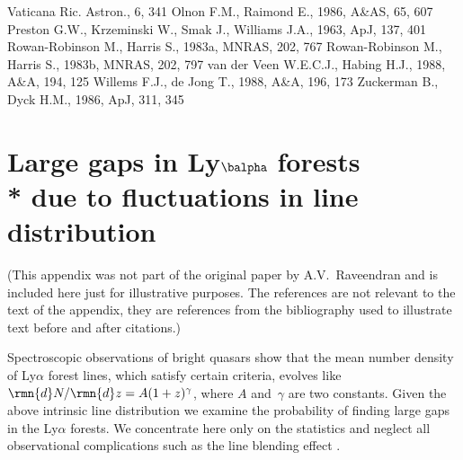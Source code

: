 \documentclass[useAMS,usedcolumn,usegraphicx,usenatbib]{mn2e}
\begin{document}
\begin{thebibliography}{99}
Vaticana Ric. Astron., 6, 341
 Olnon F.M., Raimond E., 1986,
A\&AS, 65, 607
 Preston G.W., Krzeminski W., Smak J.,
Williams J.A., 1963, ApJ, 137, 401
 Rowan-Robinson M., Harris
S., 1983a, MNRAS, 202, 767
 Rowan-Robinson M., Harris
S., 1983b, MNRAS, 202, 797
 van der Veen W.E.C.J., Habing
H.J., 1988, A\&A, 194, 125
 Willems F.J., de Jong T., 1988,
A\&A, 196, 173
 Zuckerman B., Dyck H.M., 1986, ApJ,
311, 345

\end{thebibliography}

\appendix

\section[]{Large gaps in L\lowercase{y}${\balpha}$ forests\\* due to fluctuations in line distribution}

(This appendix was not part of the original paper by
A.V.~Raveendran and is included here just for illustrative
purposes. The references are not relevant to the text of the
appendix, they are references from the bibliography used to
illustrate text before and after citations.)

Spectroscopic observations of bright quasars show that the mean
number density of Ly$\alpha$ forest lines, which satisfy certain
criteria, evolves like $\rmn{d}N/\rmn{d}z=A(1+z)^\gamma$, where
$A$ and~$\gamma$ are two constants.  Given the above intrinsic
line distribution we examine the probability of finding large gaps
in the Ly$\alpha$ forests.  We concentrate here only on the
statistics and neglect all observational complications such as the
line blending effect \citep[see][for example]{b11}.
\end{document}
